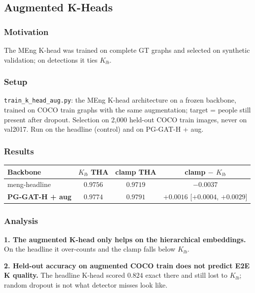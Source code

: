 \subsection{Augmented K-Heads}

\subsubsection{Motivation}

The MEng K-head was trained on complete GT graphs and selected on synthetic validation; on detections it ties $K_{lb}$.

\subsubsection{Setup}

\texttt{train\_k\_head\_aug.py}: the MEng K-head architecture on a frozen backbone, trained on COCO train graphs with the same augmentation; target = people still present after dropout. Selection on 2,000 held-out COCO train images, never on val2017. Run on the headline (control) and on PG-GAT-H + aug.

\subsubsection{Results}

\begin{tabular}{lccc}
\hline
\textbf{Backbone} & \textbf{$K_{lb}$ THA} & \textbf{clamp THA} & \textbf{clamp $-$ $K_{lb}$} \\
\hline
meng-headline       & $0.9756$ & $0.9719$ & $-0.0037$ \\
\textbf{PG-GAT-H + aug} & $0.9774$ & $\mathbf{0.9791}$ & $+0.0016$ [$+0.0004$, $+0.0029$] \\
\hline
\end{tabular}

\subsubsection{Analysis}

\textbf{1. The augmented K-head only helps on the hierarchical embeddings.} On the headline it over-counts and the clamp falls below $K_{lb}$.

\textbf{2. Held-out accuracy on augmented COCO train does not predict E2E K quality.} The headline K-head scored $0.824$ exact there and still lost to $K_{lb}$; random dropout is not what detector misses look like.

